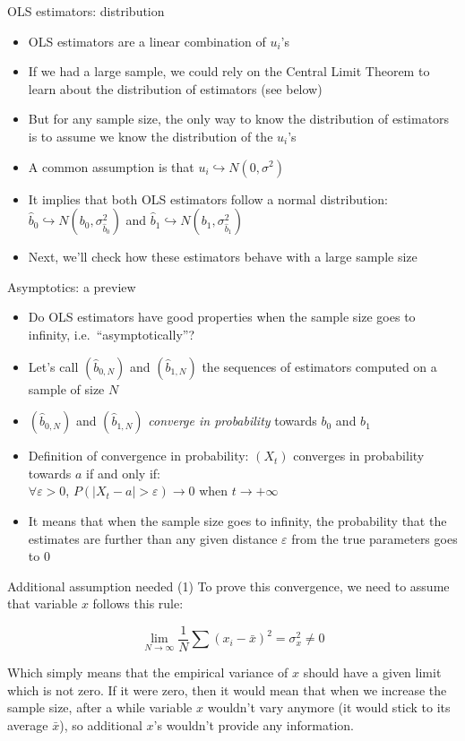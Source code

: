 \documentclass[aspectratio=169]{beamer}
\begin{document}
\begin{frame}{OLS estimators: distribution}
\begin{itemize}
    \item OLS estimators are a linear combination of $u_i$'s
    \item If we had a large sample, we could rely on the Central Limit Theorem to learn about the distribution of estimators (see below)
    \item But for any sample size, the only way to know the distribution of estimators is to assume we know the distribution of the $u_i$'s
    \item A common assumption is that $u_i \hookrightarrow N(0, \sigma^2)$
    \item It implies that both OLS estimators follow a normal distribution:\\
    $\hat{b}_0 \hookrightarrow N(b_0, \sigma_{\hat{b}_0}^2)$ and $\hat{b}_1 \hookrightarrow N(b_1, \sigma_{\hat{b}_1}^2)$
    \item Next, we'll check how these estimators behave with a large sample size
\end{itemize}
\end{frame}

\begin{frame}{Asymptotics: a preview}
\begin{itemize}
    \item Do OLS estimators have good properties when the sample size goes to infinity, i.e.\ ``asymptotically''?
    \item Let's call $(\hat{b}_{0,N})$ and $(\hat{b}_{1,N})$ the sequences of estimators computed on a sample of size $N$
    \item $(\hat{b}_{0,N})$ and $(\hat{b}_{1,N})$ \textit{converge in probability} towards $b_0$ and $b_1$
    \item Definition of convergence in probability: $(X_t)$ converges in probability towards $a$ if and only if:\\
    $\forall \varepsilon > 0$, $P(|X_t - a| > \varepsilon) \to 0$ when $t \to +\infty$
    \item It means that when the sample size goes to infinity, the probability that the estimates are further than any given distance $\varepsilon$ from the true parameters goes to 0
\end{itemize}
\end{frame}

\begin{frame}{Additional assumption needed (1)}
To prove this convergence, we need to assume that variable $x$ follows this rule:

\[\lim_{N\to\infty} \frac{1}{N}\sum(x_i - \bar{x})^2 = \sigma_x^2 \neq 0\]

Which simply means that the empirical variance of $x$ should have a given limit which is not zero. If it were zero, then it would mean that when we increase the sample size, after a while variable $x$ wouldn't vary anymore (it would stick to its average $\bar{x}$), so additional $x$'s wouldn't provide any information.
\end{frame}
\end{document}
